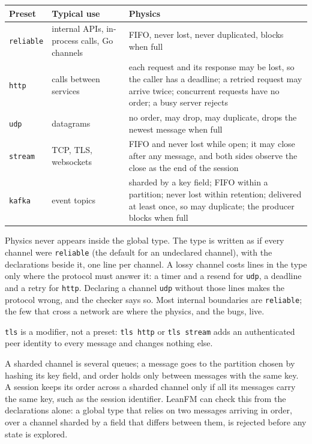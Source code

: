 \begin{center}
\small
\begin{tabular}{@{}p{}p{}p{}@{}}
\toprule
Preset & Typical use & Physics \\
\midrule
\texttt{reliable} & internal APIs, in-process calls, Go channels & FIFO, never lost, never duplicated, blocks when full \\
\texttt{http} & calls between services & each request and its response may be lost, so the caller has a deadline; a retried request may arrive twice; concurrent requests have no order; a busy server rejects \\
\texttt{udp} & datagrams & no order, may drop, may duplicate, drops the newest message when full \\
\texttt{stream} & TCP, TLS, websockets & FIFO and never lost while open; it may close after any message, and both sides observe the close as the end of the session \\
\texttt{kafka} & event topics & sharded by a key field; FIFO within a partition; never lost within retention; delivered at least once, so may duplicate; the producer blocks when full \\
\bottomrule
\end{tabular}
\end{center}

Physics never appears inside the global type. The type is written as if every
channel were \texttt{reliable} (the default for an undeclared channel), with the
declarations beside it, one line per channel. A lossy channel costs lines in the
type only where the protocol must answer it: a timer and a resend for
\texttt{udp}, a deadline and a retry for \texttt{http}. Declaring a channel
\texttt{udp} without those lines makes the protocol wrong, and the checker says
so. Most internal boundaries are \texttt{reliable}; the few that cross a network
are where the physics, and the bugs, live.

\texttt{tls} is a modifier, not a preset: \texttt{tls http} or \texttt{tls
stream} adds an authenticated peer identity to every message and changes nothing
else.

A sharded channel is several queues; a message goes to the partition chosen by
hashing its key field, and order holds only between messages with the same key.
A session keeps its order across a sharded channel only if all its messages carry
the same key, such as the session identifier. LeanFM can check this from the
declarations alone: a global type that relies on two messages arriving in order,
over a channel sharded by a field that differs between them, is rejected before
any state is explored.

